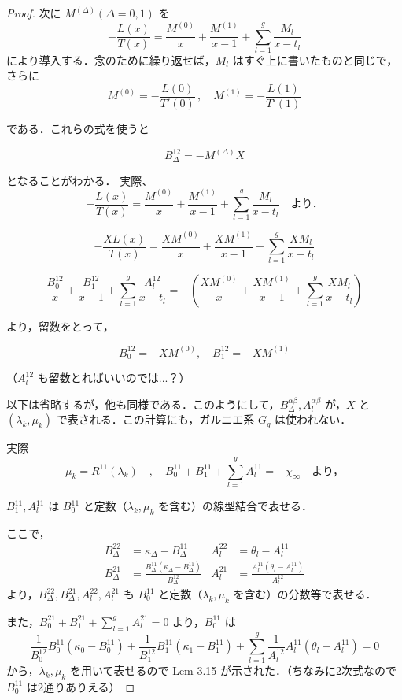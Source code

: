 \documentclass[paper=a4, fontsize=11pt]{jlreq} %
\newenvironment{story}{%
  \begin{mdframed}[
    backgroundcolor=red!5, %
    linewidth=0pt,         %
    innertopmargin=10pt,   %
    innerbottommargin=10pt,
    innerrightmargin=10pt, %
    innerleftmargin=10pt
  ]%
}{%
  \end{mdframed}%
}
\theoremstyle{break}
\theoremstyle{qa}
\begin{document}
\begin{story}
\begin{proof}
次に $M^{(\Delta)} (\Delta=0, 1)$ を
\[
-\frac{L(x)}{T(x)} = \frac{M^{(0)}}{x} + \frac{M^{(1)}}{x-1} + \sum_{l=1}^g \frac{M_l}{x-t_l}
\]
により導入する．念のために繰り返せば，$M_l$ はすぐ上に書いたものと同じで，さらに
\[
M^{(0)} = -\frac{L(0)}{T'(0)} \, , \quad M^{(1)} = -\frac{L(1)}{T'(1)}
\]

である．これらの式を使うと

\[
B_\Delta^{12} = -M^{(\Delta)} X
\]

となることがわかる．
実際、
$$
-\frac{L(x)}{T(x)} = \frac{M^{(0)}}{x} + \frac{M^{(1)}}{x-1} + \sum_{l=1}^g \frac{M_l}{x-t_l} \quad \text{より．}
$$

$$
-\frac{X L(x)}{T(x)} = \frac{X M^{(0)}}{x} + \frac{X M^{(1)}}{x-1} + \sum_{l=1}^g \frac{X M_l}{x-t_l}
$$

$$
\frac{B_0^{12}}{x} + \frac{B_1^{12}}{x-1} + \sum_{l=1}^g \frac{A_l^{12}}{x-t_l} = - \left( \frac{X M^{(0)}}{x} + \frac{X M^{(1)}}{x-1} + \sum_{l=1}^g \frac{X M_l}{x-t_l} \right)
$$

より，留数をとって，

$$
B_0^{12} = -X M^{(0)}, \quad B_1^{12} = -X M^{(1)}
$$

（$A_l^{12}$ も留数とればいいのでは...？）

以下は省略するが，他も同様である．このようにして，$B_\Delta^{\alpha\beta}, A_l^{\alpha\beta}$ が，$X$ と $(\lambda_k, \mu_k)$ で表される．この計算にも，ガルニエ系 $G_g$ は使われない．

実際
$$
\mu_k = R^{11}(\lambda_k) \quad , \quad B_0^{11} + B_1^{11} + \sum_{l=1}^g A_l^{11} = - \chi_\infty \quad \text{より，}
$$

$B_1^{11}, A_l^{11}$ は $B_0^{11}$ と定数（$\lambda_k, \mu_k$ を含む）の線型結合で表せる．

ここで，
\begin{align*}
    B_\Delta^{22} &= \kappa_\Delta - B_\Delta^{11} & A_l^{22} &= \theta_l - A_l^{11} \\
    B_\Delta^{21} &= \frac{B_\Delta^{11}(\kappa_\Delta - B_\Delta^{11})}{B_\Delta^{12}} & A_l^{21} &= \frac{A_l^{11}(\theta_l - A_l^{11})}{A_l^{12}}
\end{align*}
より，$B_\Delta^{22}, B_\Delta^{21}, A_l^{22}, A_l^{21}$ も $B_0^{11}$ と定数（$\lambda_k, \mu_k$ を含む）の分数等で表せる．

また，$B_0^{21} + B_1^{21} + \sum_{l=1}^g A_l^{21} = 0$ より，$B_0^{11}$ は
$$
\frac{1}{B_0^{12}} B_0^{11}(\kappa_0 - B_0^{11}) + \frac{1}{B_1^{12}} B_1^{11}(\kappa_1 - B_1^{11}) + \sum_{l=1}^g \frac{1}{A_l^{12}} A_l^{11}(\theta_l - A_l^{11}) = 0
$$
から，$\lambda_k, \mu_k$ を用いて表せるので Lem 3.15 が示された．（ちなみに2次式なので $B_0^{11}$ は2通りありえる）
\end{proof}


\end{story}
\end{document}
